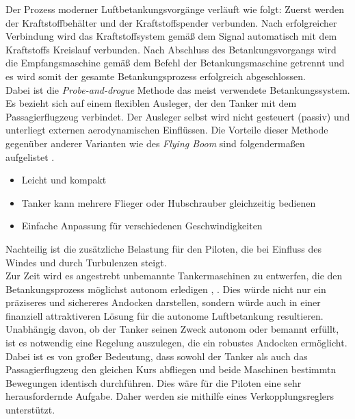 Der Prozess moderner Luftbetankungsvorgänge verläuft wie folgt: Zuerst werden der Kraftstoffbehälter und der Kraftstoffspender verbunden. Nach erfolgreicher Verbindung wird das Kraftstoffsystem gemäß dem Signal automatisch mit dem Kraftstoffs Kreislauf verbunden. Nach Abschluss des Betankungsvorgangs wird die Empfangsmaschine gemäß dem Befehl der Betankungsmaschine getrennt und es wird somit der gesamte Betankungsprozess erfolgreich abgeschlossen.\\
Dabei ist die \textit{Probe-and-drogue} Methode das meist verwendete Betankungssystem. Es bezieht sich auf einem flexiblen Ausleger, der den Tanker mit dem Passagierflugzeug verbindet. Der Ausleger selbst wird nicht gesteuert (passiv) und unterliegt externen aerodynamischen Einflüssen. Die Vorteile dieser Methode gegenüber anderer Varianten wie des \textit{Flying Boom} sind folgendermaßen aufgelistet \cite{Methoden}.
\begin{itemize}
    \item Leicht und kompakt
    \item Tanker kann mehrere Flieger oder Hubschrauber gleichzeitig bedienen
    \item Einfache Anpassung für verschiedenen Geschwindigkeiten 
\end{itemize}
Nachteilig ist die zusätzliche Belastung für den Piloten, die bei Einfluss des Windes und durch Turbulenzen steigt.\\ 
Zur Zeit wird es angestrebt unbemannte Tankermaschinen zu entwerfen, die den Betankungsprozess möglichst autonom erledigen \cite{Autonom1}, \cite{Autonom2}. Dies würde nicht nur ein präziseres und sichereres Andocken darstellen, sondern würde auch in einer finanziell attraktiveren Lösung für die autonome Luftbetankung resultieren.\\
Unabhängig davon, ob der Tanker seinen Zweck autonom oder bemannt erfüllt, ist es notwendig eine Regelung auszulegen, die ein robustes Andocken ermöglicht. Dabei ist es von großer Bedeutung, dass sowohl der Tanker als auch das Passagierflugzeug den gleichen Kurs abfliegen und beide Maschinen bestimmtn Bewegungen identisch durchführen. Dies wäre für die Piloten eine sehr herausfordernde Aufgabe. Daher werden sie mithilfe eines Verkopplungsreglers unterstützt. 
